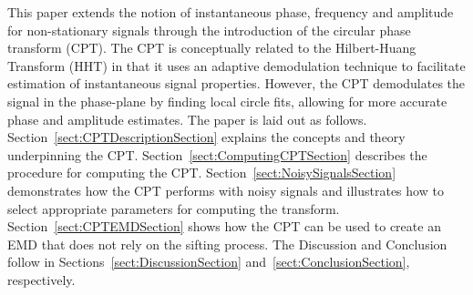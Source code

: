 \documentclass[a4paper]{IEEEtran}
\begin{document}
% 

This paper extends the notion of instantaneous phase, frequency and amplitude for non-stationary signals through the introduction of the circular phase transform (CPT). The CPT is conceptually related to the Hilbert-Huang Transform (HHT) in that it uses an adaptive demodulation technique to facilitate estimation of instantaneous signal properties. However, the CPT demodulates the signal in the phase-plane by finding local circle fits, allowing for more accurate phase and amplitude estimates. The paper is laid out as follows. Section~\ref{sect:CPTDescriptionSection} explains the concepts and theory underpinning the CPT. Section~\ref{sect:ComputingCPTSection} describes the procedure for computing the CPT. Section~\ref{sect:NoisySignalsSection} demonstrates how the CPT performs with noisy signals and illustrates how to select appropriate parameters for computing the transform. Section~\ref{sect:CPTEMDSection} shows how the CPT can be used to create an EMD that does not rely on the sifting process. %
The Discussion and Conclusion follow in Sections~\ref{sect:DiscussionSection} and~\ref{sect:ConclusionSection}, respectively. 
\end{document}

